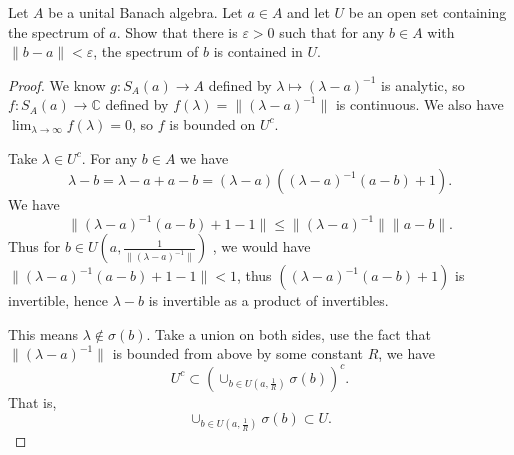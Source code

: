 \begin{problem}
	Let $A$ be a unital Banach algebra. Let $a \in A$ and let $U$ be an open set containing the spectrum of $a$. Show that there is $\varepsilon>0$ such that for any $b \in A$ with $\|b-a\|<\varepsilon$, the spectrum of $b$ is contained in $U$.
\end{problem}
\begin{proof}
	We know $g: S_A(a) \to A$ defined by $\lambda\mapsto (\lambda - a)^{-1}$ is analytic, so $f:S_A(a) \to \mathbb{C}$ defined by $f(\lambda) = \|(\lambda - a)^{-1}\|$ is continuous. We also have $\lim_{\lambda \to \infty } f(\lambda) = 0$, so $f$ is bounded on $U^c$. 

	Take $\lambda \in U^c$. For any $b \in A$ we have
	\[
		\lambda - b = \lambda - a + a - b = (\lambda - a)\left( (\lambda - a)^{-1} (a - b) + 1 \right) 
	.\] 
	We have
	\[
		\| (\lambda - a)^{-1} (a - b) + 1  - 1\| \le \|(\lambda - a)^{-1}\| \|a - b\|
	.\] 
	Thus for $b \in U(a, \frac{1}{\|(\lambda - a)^{-1}\|})$ , we would have $\| (\lambda - a)^{-1} (a - b) + 1  - 1\| < 1$, thus  $((\lambda - a)^{-1} (a - b) + 1)$ is invertible, hence $\lambda - b$ is invertible as a product of invertibles.

	This means  $\lambda \not\in \sigma(b)$. Take a union on both sides, use the fact that $\|(\lambda - a)^{-1}\|$ is bounded from above by some constant $R$, we have
	\[
		U^c \subset \left( \cup _{b \in U\left( a, \frac{1}{R} \right) } \sigma(b) \right) ^c
	.\] 
	That is,
	\[
		\cup _{b \in U\left( a, \frac{1}{R} \right) } \sigma(b) \subset U
	.\] 
\end{proof}


